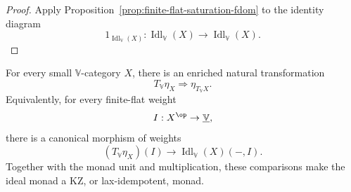 \begin{proof}
Apply Proposition~\ref{prop:finite-flat-saturation-fdom} to the identity diagram
\[
    1_{\operatorname{Idl}_{\mathbb V}(X)}:
    \operatorname{Idl}_{\mathbb V}(X)\to\operatorname{Idl}_{\mathbb V}(X).
\]
\end{proof}

\begin{proposition}
\label{prop:ideal-monad-kz-fdom}
For every small \(\mathbb V\)-category \(X\), there is an enriched natural
transformation
\[
    T_{\mathbb V}\eta_X\Longrightarrow \eta_{T_{\mathbb V}X}.
\]
Equivalently, for every finite-flat weight
\[
    I:X^{\op}\to\underline{\mathbb V},
\]
there is a canonical morphism of weights
\[
    (T_{\mathbb V}\eta_X)(I)
    \longrightarrow
    \operatorname{Idl}_{\mathbb V}(X)(-,I).
\]
Together with the monad unit and multiplication, these comparisons make the ideal
monad a KZ, or lax-idempotent, monad.
\end{proposition}

